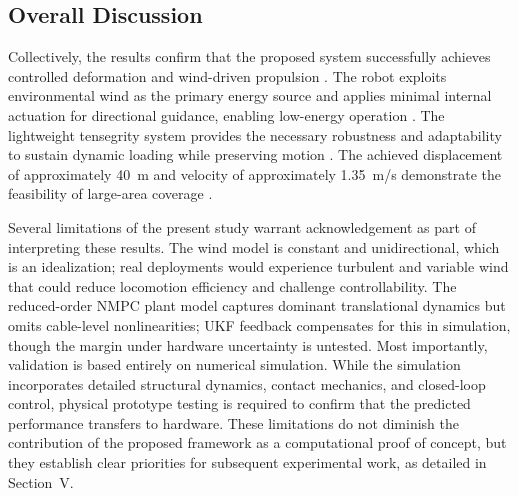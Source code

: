 \documentclass[conference]{IEEEtran}
\begin{document}
\subsection{Overall Discussion}
Collectively, the results confirm that the proposed system successfully
achieves controlled deformation and wind-driven propulsion \cite{b12,b13}. The
robot exploits environmental wind as the primary energy source and applies
minimal internal actuation for directional guidance, enabling low-energy
operation \cite{b11,b19}. The lightweight tensegrity system provides the
necessary robustness and adaptability to sustain dynamic loading while
preserving motion \cite{b1,b2}. The achieved displacement of approximately
40~m and velocity of approximately 1.35~m/s demonstrate the feasibility of
large-area coverage \cite{b21}.

Several limitations of the present study warrant acknowledgement as part of
interpreting these results. The wind model is constant and unidirectional,
which is an idealization; real deployments would experience turbulent and
variable wind that could reduce locomotion efficiency and challenge
controllability. The reduced-order NMPC plant model captures dominant
translational dynamics but omits cable-level nonlinearities; UKF feedback
compensates for this in simulation, though the margin under hardware
uncertainty is untested. Most importantly, validation is based entirely on
numerical simulation. While the simulation incorporates detailed structural
dynamics, contact mechanics, and closed-loop control, physical prototype
testing is required to confirm that the predicted performance transfers to
hardware. These limitations do not diminish the contribution of the proposed
framework as a computational proof of concept, but they establish clear
priorities for subsequent experimental work, as detailed in Section~V.

\end{document}
